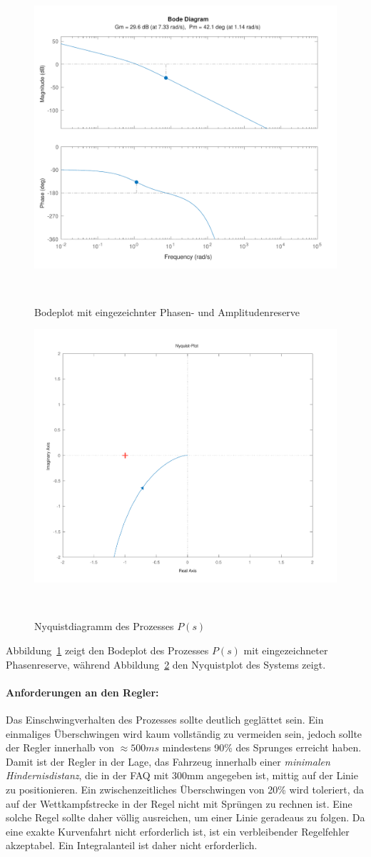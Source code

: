 \documentclass[main.tex]{subfiles} %
\begin{document}
\begin{figure}[H]
    \centering
    \includegraphics[width=0.5\linewidth]{fig_Parametrierung_Linienfolgeregler/Bode_Plot_Prozess.pdf}
    \caption{Bodeplot mit eingezeichnter Phasen- und Amplitudenreserve}~\label{fig:MarginPlot_raw}
\end{figure}

\begin{figure}[H]
    \centering
    \includegraphics[width=0.5\linewidth]{fig_Parametrierung_Linienfolgeregler/NyquistPlot_System.pdf}
    \caption{Nyquistdiagramm des Prozesses $P(s)$}~\label{fig:Nyquist_raw}
\end{figure}

Abbildung~\ref{fig:MarginPlot_raw} zeigt den Bodeplot des Prozesses $P(s)$ mit
eingezeichneter Phasenreserve, während Abbildung~\ref{fig:Nyquist_raw} den
Nyquistplot des Systems zeigt.

\paragraph{Anforderungen an den Regler:} Das Einschwingverhalten des Prozesses sollte deutlich geglättet sein. Ein
einmaliges Überschwingen wird kaum vollständig zu vermeiden sein, jedoch sollte
der Regler innerhalb von $\approx 500 ms$ mindestens 90\% des Sprunges erreicht
haben. Damit ist der Regler in der Lage, das Fahrzeug innerhalb einer
\textit{minimalen Hindernisdistanz}, die in der FAQ mit 300mm angegeben ist,
mittig auf der Linie zu positionieren. Ein zwischenzeitliches Überschwingen von
20\% wird toleriert, da auf der Wettkampfstrecke in der Regel nicht mit
Sprüngen zu rechnen ist. Eine solche Regel sollte daher völlig ausreichen, um
einer Linie geradeaus zu folgen. Da eine exakte Kurvenfahrt nicht erforderlich
ist, ist ein verbleibender Regelfehler akzeptabel. Ein Integralanteil ist daher
nicht erforderlich.
\end{document}
